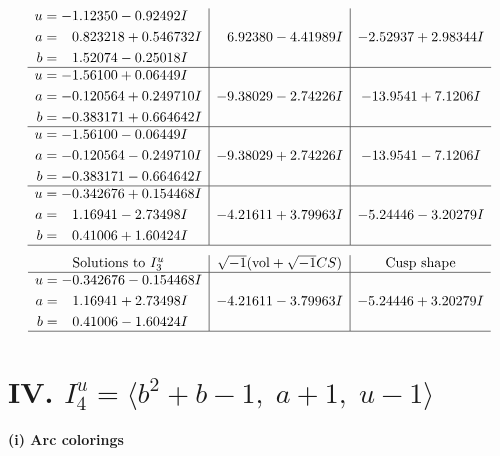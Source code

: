 \documentclass[1p]{elsarticle_modified}
\theoremstyle{definition}
\newcommand{\I}{\sqrt{-1}}
\begin{document}
$$\begin{array}{c|c|c}
\begin{aligned}
u &= -1.12350 - 0.92492 I \\
a &= \phantom{-}0.823218 + 0.546732 I \\
b &= \phantom{-}1.52074 - 0.25018 I\end{aligned}
 & \phantom{-}6.92380 - 4.41989 I & -2.52937 + 2.98344 I \\ \hline\begin{aligned}
u &= -1.56100 + 0.06449 I \\
a &= -0.120564 + 0.249710 I \\
b &= -0.383171 + 0.664642 I\end{aligned}
 & -9.38029 - 2.74226 I & -13.9541 + 7.1206 I \\ \hline\begin{aligned}
u &= -1.56100 - 0.06449 I \\
a &= -0.120564 - 0.249710 I \\
b &= -0.383171 - 0.664642 I\end{aligned}
 & -9.38029 + 2.74226 I & -13.9541 - 7.1206 I \\ \hline\begin{aligned}
u &= -0.342676 + 0.154468 I \\
a &= \phantom{-}1.16941 - 2.73498 I \\
b &= \phantom{-}0.41006 + 1.60424 I\end{aligned}
 & -4.21611 + 3.79963 I & -5.24446 - 3.20279 I\\
 \hline 
 \end{array}$$\newpage$$\begin{array}{c|c|c}  
\text{Solutions to }I^u_{3}& \I (\text{vol} + \sqrt{-1}CS) & \text{Cusp shape}\\
 \hline 
\begin{aligned}
u &= -0.342676 - 0.154468 I \\
a &= \phantom{-}1.16941 + 2.73498 I \\
b &= \phantom{-}0.41006 - 1.60424 I\end{aligned}
 & -4.21611 - 3.79963 I & -5.24446 + 3.20279 I\\
 \hline 
 \end{array}$$\newpage\newpage\renewcommand{\arraystretch}{1}
\centering \section*{IV. $I^u_{4}= \langle b^2+b-1,\;a+1,\;u-1 \rangle$}
\flushleft \textbf{(i) Arc colorings}\\
\end{document}
